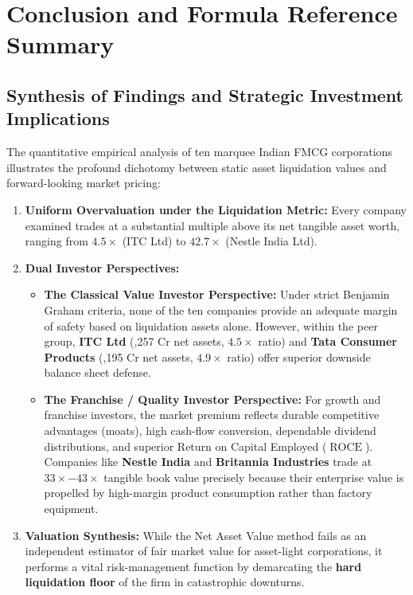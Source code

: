 
\clearpage
\section[Conclusion \& Formula Reference]{Conclusion and Formula Reference Summary}

\subsection{Synthesis of Findings and Strategic Investment Implications}
The quantitative empirical analysis of ten marquee Indian FMCG corporations illustrates the profound dichotomy between static asset liquidation values and forward-looking market pricing:

\begin{enumerate}[label=\textbf{\arabic*.}, topsep=3pt, itemsep=2pt, parsep=0pt]
    \item \textbf{Uniform Overvaluation under the Liquidation Metric:} Every company examined trades at a substantial multiple above its net tangible asset worth, ranging from $4.5\times$ (ITC Ltd) to $42.7\times$ (Nestle India Ltd).
    \item \textbf{Dual Investor Perspectives:}
    \begin{itemize}[topsep=2pt, itemsep=2pt, parsep=0pt]
        \item \textbf{The Classical Value Investor Perspective:} Under strict Benjamin Graham criteria, none of the ten companies provide an adequate margin of safety based on liquidation assets alone. However, within the peer group, \textbf{ITC Ltd} (,257 Cr net assets, $4.5\times$ ratio) and \textbf{Tata Consumer Products} (,195 Cr net assets, $4.9\times$ ratio) offer superior downside balance sheet defense.
        \item \textbf{The Franchise / Quality Investor Perspective:} For growth and franchise investors, the market premium reflects durable competitive advantages (moats), high cash-flow conversion, dependable dividend distributions, and superior Return on Capital Employed ($\operatorname{ROCE}$). Companies like \textbf{Nestle India} and \textbf{Britannia Industries} trade at $33\times - 43\times$ tangible book value precisely because their enterprise value is propelled by high-margin product consumption rather than factory equipment.
    \end{itemize}
    \item \textbf{Valuation Synthesis:} While the Net Asset Value method fails as an independent estimator of fair market value for asset-light corporations, it performs a vital risk-management function by demarcating the \textbf{hard liquidation floor} of the firm in catastrophic downturns.
\end{enumerate}

